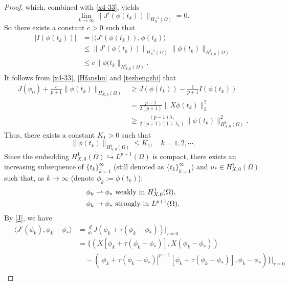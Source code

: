 \documentclass[10pt,a4paper]{amsart}
\begin{document}
\begin{proof}
which, combined with \eqref{x4-33}, yields
\begin{equation}\label{x6-33}
\lim_{k\rightarrow\infty}\|J'(\phi(t_k))\|_{H_X^{-1}(\Omega)}=0.
\end{equation}
So there exists a constant $c>0$ such that
\begin{equation*}
\begin{split}
|I(\phi(t_k))|&=|\langle J'(\phi(t_k)),\phi(t_k)\rangle|\\
&\leq\|J'(\phi(t_k))\|_{H_X^{-1}(\Omega)}\|\phi(t_k)\|_{H_{X,0}^1(\Omega)}\\
&\leq c\|\phi(t_k\|_{H_{X,0}^1(\Omega)}.
\end{split}
\end{equation*}
It follows from \eqref{x4-33}, \eqref{Hfanshu} and \eqref{tezhengzhi} that
\begin{equation*}
\begin{split}
J(\phi_0)+\frac{c}{p+1}\|\phi(t_k)\|_{H_{X,0}^1(\Omega)}&\geq J(\phi(t_k))-\frac{1}{p+1}I(\phi(t_k))\\
&=\frac{p-1}{2(p+1)}\|X\phi(t_k)\|_2^2\\
&\geq\frac{(p-1)\lambda_1}{2(p+1)(1+\lambda_1)}\|\phi(t_k)\|_{H_{X,0}^1(\Omega)}^2.
\end{split}
\end{equation*}
Thus, there exists a constant $K_1>0$ such that
\begin{equation}\label{x8-33}
\|\phi(t_k)\|_{H_{X,0}^1(\Omega)}\leq K_1, \quad k=1,2,\cdots.
\end{equation}
Since the embedding $H_{X,0}^1(\Omega)\hookrightarrow L^{p+1}(\Omega)$ is compact, there exists an increasing subsequence of $\{t_k\}_{k=1}^\infty$ (still denoted as $\{t_k\}_{k=1}^\infty$) and $u_*\in H_{X,0}^1(\Omega)$ such that, as $k\rightarrow\infty$ (denote $\phi_k:=\phi(t_k)$):
\begin{align}
&\phi_k\rightharpoonup \phi_* \hbox{ weakly in } H_{X,0}^1(\Omega),\label{x9-33}\\
&\phi_k\rightarrow \phi_* \hbox{ strongly in } L^{p+1}(\Omega).\label{x10-33}
\end{align}
By \eqref{J}, we have
\begin{equation*}
\begin{split}
\quad\langle J'(\phi_k),\phi_k-\phi_*\rangle&=\frac{d}{d\tau}J(\phi_k+\tau (\phi_k-\phi_*))\bigg|_{\tau=0}\\
&=\big\{\left(X[\phi_k+\tau(\phi_k-\phi_*)],X(\phi_k-\phi_*)\right)\\
&\quad-\left(|\phi_k+\tau(\phi_k-\phi_*)|^{p-1}[\phi_k+\tau(\phi_k-\phi_*)],\phi_k-\phi_*\right)\big\}\big|_{\tau=0}\\

\end{split}
\end{equation*}
\end{proof}
\end{document}
